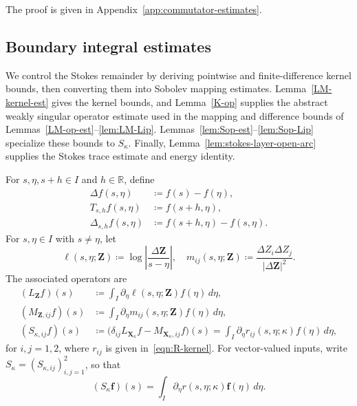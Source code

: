 \documentclass[11pt,reqno]{amsart}
\theoremstyle{plain}
\theoremstyle{definition}
\numberwithin{equation}{section}
\newcommand{\p}{\partial}
\newcommand{\bm}[1]{\boldsymbol{#1}}
\newcommand{\abs}[1]{\left\lvert #1 \right\rvert}
\newcommand{\R}{\mathbb{R}}
\begin{document}
The proof is given in Appendix~\ref{app:commutator-estimates}.

\subsection{Boundary integral estimates}
\label{sec:divided-diff}

We control the Stokes remainder by deriving pointwise and finite-difference
kernel bounds, then converting them into Sobolev mapping estimates.
Lemma~\ref{LM-kernel-est} gives the kernel bounds, and
Lemma~\ref{K-op} supplies the abstract weakly singular operator estimate
used in the mapping and difference bounds of
Lemmas~\ref{LM-op-est}--\ref{lem:LM-Lip}.
Lemmas~\ref{lem:Sop-est}--\ref{lem:Sop-Lip} specialize these bounds to
$S_\kappa$.
Finally, Lemma~\ref{lem:stokes-layer-open-arc} supplies the Stokes trace
estimate and energy identity.

For $s,\eta,s+h\in I$ and $h\in\R$, define
\begin{align}
    \Delta f(s,\eta)&\coloneqq f(s)-f(\eta), \\
    T_{s,h}f(s,\eta)&\coloneqq f(s+h,\eta), \\
    \Delta_{s,h}f(s,\eta)&\coloneqq f(s+h,\eta)-f(s,\eta).
\end{align}
For $s,\eta\in I$ with $s\ne\eta$, let
\begin{equation}\label{eqn:LM-kernel}
    \ell(s,\eta;\bm Z)
    \coloneqq\log\abs{\frac{\Delta\bm Z}{s-\eta}},
    \quad
    m_{ij}(s,\eta;\bm Z)
    \coloneqq\frac{\Delta Z_i\Delta Z_j}{\abs{\Delta\bm Z}^2}.
\end{equation}
The associated operators are
\begin{align}
    (L_{\bm Z}f)(s)
    &\coloneqq\int_I\p_\eta \ell(s,\eta;\bm Z)f(\eta)\,d\eta,
    \label{eqn:F-def}\\
    (M_{\bm Z,ij}f)(s)
    &\coloneqq\int_I\p_\eta m_{ij}(s,\eta;\bm Z)f(\eta)\,d\eta,
    \label{eqn:M-def}\\
    (S_{\kappa,ij}f)(s)
    &\coloneqq\bigl(\delta_{ij}L_{\bm X_\kappa}f
    -M_{\bm X_\kappa,ij}f\bigr)(s) = \int_I\p_\eta r_{ij}(s,\eta;\kappa)f(\eta)\,d\eta,\label{eqn:Sop-definition}
\end{align}
for $i,j=1,2$, where $r_{ij}$ is given in~\eqref{eqn:R-kernel}.
For vector-valued inputs, write $S_\kappa=(S_{\kappa,ij})_{i,j=1}^2$, so that
\begin{equation*}
    (S_\kappa\bm f)(s)
    =\int_I\p_\eta r(s,\eta;\kappa)\bm f(\eta)\,d\eta.
\end{equation*}
\end{document}

